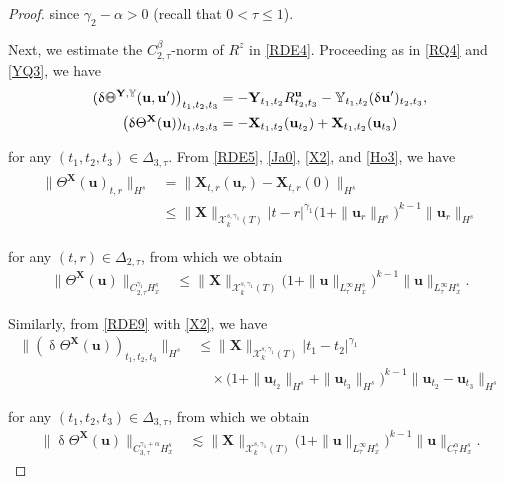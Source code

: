 \documentclass[letterpaper, 11pt,  reqno]{amsart}
\newcommand{\1}{\hspace{0.5mm}\textup{I}\hspace{0.5mm}}
\newcommand{\noi}{\noindent}
\newcommand{\al}{\alpha}
\newcommand{\be}{\beta}
\newcommand{\updl}{\updelta}
\newcommand{\Dl}{\Delta}
\newcommand{\g}{\gamma}
\newcommand{\les}{\lesssim}
\newcommand{\cX}{\mathcal{X}}
\newcommand{\uu}{\mathbf{u}}
\newcommand{\Ta}{\Theta}
\newcommand{\YYb}{\mathbb{Y}}
\newcommand{\XX}{\mathbf{X}}
\newcommand{\YY}{\mathbf{Y}}
\def\doublestroke#1{\pdfliteral{1 Tr .35 w}#1\pdfliteral{0 Tr 0 w}}
\newcommand{\Taa}{\doublestroke{\Theta}}
\numberwithin{equation}{section}
\numberwithin{theorem}{section}
\begin{document}
\begin{proof}
\noi
since  $\g_2 - \al > 0$
(recall that $0 < \tau \le 1$).



Next, we estimate the $C^\be_{2, \tau}$-norm of $R^z$
in \eqref{RDE4}.
Proceeding as in 
\eqref{RQ4} and \eqref{YQ3}, we have 
\begin{align}
\begin{split}
(\updl \Taa^{\YY, \YYb}(\uu, \uu')\big)_{t_1, t_2, t_3}
& = - \YY_{t_1,t_2} R^\uu_{t_2,t_3} - \YYb_{t_1,t_2} (\updl \uu')_{t_2,t_3}, \\
 \big(\updl  \Ta^{\XX}(\uu) )_{t_1, t_2, t_3}
& = 
-  \XX_{t_1, t_2}(\uu_{t_2})
+   \XX_{t_1, t_2}( \uu_{t_3})
\end{split}
\label{RDE9}
\end{align}

\noi
for any $(t_1, t_2, t_3) \in \Dl_{3, \tau}$.
From \eqref{RDE5},    \eqref{Ja0},    \eqref{X2}, and \eqref{Ho3}, 
we have
\begin{align}
\begin{split}
\| \Ta^\XX(\uu)_{t, r} \|_{H^s}
& = \| \XX_{t, r}(\uu_r)  - \XX_{t, r}(0) \|_{H^s}\\
& \le \|\XX\|_{\cX^{s, \g_1}_k(T)}|t- r|^{\g_1}
\big( 1+ \|\uu_r\|_{H^s}\big)^{k-1} \|\uu_r\|_{H^s}
\end{split}
\label{RDE9aa}
\end{align}

\noi
for any $(t, r) \in \Dl_{2, \tau}$, 
from which we obtain
\begin{align}
\|\Ta^\XX(\uu) \|_{C^{\g_1}_{2, \tau}H^s_x}
& \le \|\XX\|_{\cX^{s, \g_1}_k(T)}
\big(1 + \|\uu\|_{L^\infty_\tau H^s_x}\big)^{k-1} \|\uu\|_{L^\infty_\tau H^s_x}.
\label{RDE9a}
\end{align}


\noi
Similarly, from \eqref{RDE9} with \eqref{X2}, we have 
\begin{align*}
\| (\updl \Ta^\XX(\uu))_{t_1,t_2,t_3}\|_{H^s}
& \leq \|\XX\|_{\cX^{s, \g_1}_k(T)}|t_1 - t_2|^{\g_1}
\\
&\quad \times
\big(1+\|\uu_{t_2}\|_{H^s} + \|\uu_{t_3}\|_{H^s}\big)^{k-1}
\|\uu_{t_2}-\uu_{t_3}\|_{H^s} 
\end{align*}

\noi
for any $(t_1, t_2, t_3) \in \Dl_{3, \tau}$, 
from which we obtain
\begin{align}
\|\updl \Ta^\XX(\uu) \|_{C^{\g_1+\al}_{3, \tau}H^s_x}
& \les \|\XX\|_{\cX^{s, \g_1}_k(T)}
\big(1 + \|\uu\|_{L^\infty_\tau H^s_x}\big)^{k-1} \|\uu\|_{C^\al _\tau H^s_x}.
\label{RDE9b}
\end{align}


\end{proof}
\end{document}
